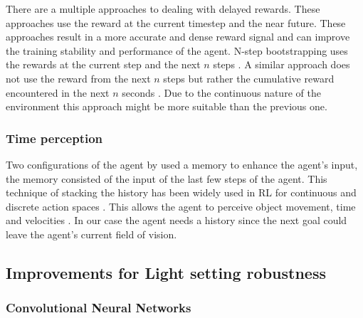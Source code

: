 There are a multiple approaches to dealing with delayed rewards. These approaches use the reward at the current timestep and the near future. These approaches result in a more accurate and dense reward signal and can improve the training stability and performance of the agent.
N-step bootstrapping uses the rewards at the current step and the next \(n\) steps \autocite{nstepbootstrapping}.  
A similar approach does not use the reward from the next \(n\) steps but rather the cumulative reward encountered in the next \(n\) seconds \autocite{trackmania}. Due to the continuous nature of the environment this approach might be more suitable than the previous one.


\subsubsection{Time perception}

Two configurations of the agent by \autocite{maximilian} used a memory to enhance the agent's input, the memory consisted of the input of the last few steps of the agent. This technique of stacking the history has been widely used in RL for continuous \autocite{atari} and discrete action spaces \autocite{alphago}. This allows the agent to perceive object movement, time and velocities \autocite{atari}.
In our case the agent needs a history since the next goal could leave the agent's current field of vision.



\subsection{Improvements for Light setting robustness} \label{light_setting_robustness}

\subsubsection{Convolutional Neural Networks}


